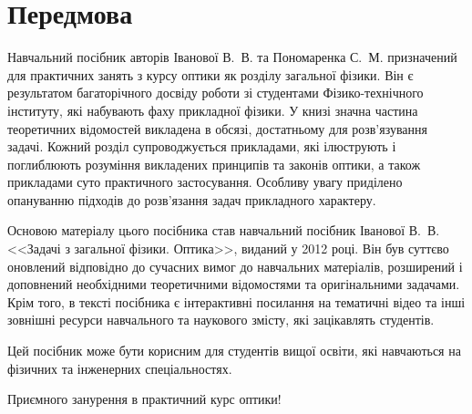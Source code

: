 
\introtrue
\chapter*{Передмова}



Навчальний посібник авторів Іванової В.~В. та Пономаренка С.~М. призначений для практичних занять з курсу оптики як розділу загальної фізики. Він є результатом багаторічного досвіду роботи зі студентами Фізико-технічного інституту, які набувають фаху прикладної фізики. У книзі значна частина теоретичних відомостей викладена в обсязі, достатньому для розв'язування задачі. Кожний розділ супроводжується прикладами, які ілюструють і поглиблюють розуміння викладених принципів та законів оптики, а також прикладами суто практичного застосування. Особливу увагу приділено опануванню підходів до розв’язання задач прикладного характеру.

Основою матеріалу цього посібника став навчальний посібник Іванової В.~В. <<Задачі з загальної фізики. Оптика>>, виданий у 2012 році. Він був суттєво оновлений відповідно до сучасних вимог до навчальних матеріалів, розширений і доповнений необхідними теоретичними відомостями та оригінальними задачами. Крім того, в тексті посібника є інтерактивні посилання на тематичні відео та інші зовнішні ресурси навчального та наукового змісту, які зацікавлять студентів.

Цей посібник може бути корисним для студентів вищої освіти, які навчаються на фізичних та інженерних спеціальностях.

Приємного занурення в практичний курс оптики!
%
\introfalse





